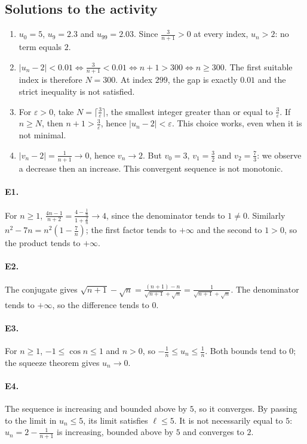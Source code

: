 \subsection{Solutions to the activity}\begin{enumerate}
\item $u_0=5$, $u_9=\num{2,3}$ and $u_{99}=\num{2,03}$. Since $\frac{3}{n+1}>0$ at every index, $u_n>2$: no term equals $2$.
\item $|u_n-2|<\num{0,01}\Longleftrightarrow \frac{3}{n+1}<\num{0,01}\Longleftrightarrow n+1>300\Longleftrightarrow n\ge300$. The first suitable index is therefore $N=300$. At index $299$, the gap is exactly $\num{0,01}$ and the strict inequality is not satisfied.
\item For $\varepsilon>0$, take $N=\lceil\frac{3}{\varepsilon}\rceil$, the smallest integer greater than or equal to $\frac{3}{\varepsilon}$. If $n\ge N$, then $n+1>\frac{3}{\varepsilon}$, hence $|u_n-2|<\varepsilon$. This choice works, even when it is not minimal.
\item $|v_n-2|=\frac{1}{n+1}\to0$, hence $v_n\to2$. But $v_0=3$, $v_1=\frac{3}{2}$ and $v_2=\frac{7}{3}$: we observe a decrease then an increase. This convergent sequence is not monotonic.
\end{enumerate}

\paragraph{E1.}For $n\ge1$, $\frac{4n-1}{n+2}=\frac{4-\frac{1}{n}}{1+\frac{2}{n}}\to4$, since the denominator tends to $1\ne0$. Similarly $n^2-7n=n^2(1-\frac{7}{n})$; the first factor tends to $+\infty$ and the second to $1>0$, so the product tends to $+\infty$.

\paragraph{E2.}The conjugate gives $\sqrt{n+1}-\sqrt{n}=\frac{(n+1)-n}{\sqrt{n+1}+\sqrt n}=\frac{1}{\sqrt{n+1}+\sqrt n}$. The denominator tends to $+\infty$, so the difference tends to $0$.

\paragraph{E3.}For $n\ge1$, $-1\le\cos n\le1$ and $n>0$, so $-\frac{1}{n}\le u_n\le\frac{1}{n}$. Both bounds tend to $0$; the squeeze theorem gives $u_n\to0$.

\paragraph{E4.}The sequence is increasing and bounded above by $5$, so it converges. By passing to the limit in $u_n\le5$, its limit satisfies $\ell\le5$. It is not necessarily equal to $5$: $u_n=2-\frac{1}{n+1}$ is increasing, bounded above by $5$ and converges to $2$.

